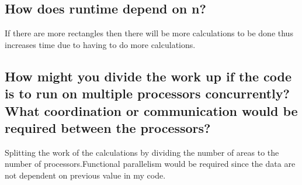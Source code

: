 \documentclass[12pt,letterpaper]{article}
\begin{document}
\subsection*{\normalsize How does runtime depend on n?}\vspace{-10pt}
If there are more rectangles then there will be more calculations to be done thus increases time due to having to do more calculations.

\subsection*{\normalsize How might you divide the work up if the code is to run on multiple processors concurrently?  What coordination or communication would be required between the processors?}\vspace{-10pt}
Splitting the work of the calculations by dividing the number of areas to the number of processors.Functional parallelism would be required since the data are not dependent on previous value in my code.


    
    
    
        
\end{document}

